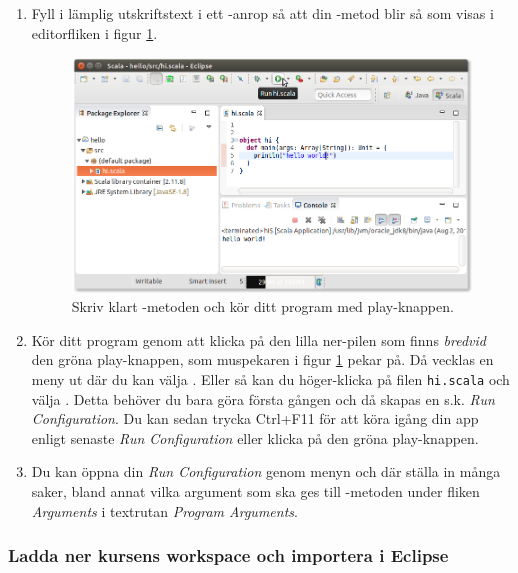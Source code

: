 \begin{enumerate}
\item Fyll i lämplig utskriftstext i ett -anrop så att din -metod blir så som visas i editorfliken i figur \ref{fig:appendix:eclipse:hello-world}.

\begin{figure}[H]
\centering
\includegraphics[width=1.0\textwidth]{../img/eclipse/eclipse-hello-world.png}
\caption{Skriv klart -metoden och kör ditt program med play-knappen.}
\label{fig:appendix:eclipse:hello-world}
\end{figure}

\item Kör ditt program genom att klicka på den lilla ner-pilen som finns \emph{bredvid} den gröna play-knappen, som muspekaren i figur \ref{fig:appendix:eclipse:hello-world} pekar på. Då vecklas en meny ut där du kan välja . Eller så kan du höger-klicka på filen \texttt{hi.scala} och välja . Detta behöver du bara göra första gången och då skapas en s.k. \textit{Run Configuration}. Du kan sedan trycka Ctrl+F11 för att köra igång din app enligt senaste \textit{Run Configuration} eller klicka på den gröna play-knappen.

\item Du kan öppna din \textit{Run Configuration} genom menyn   och där ställa in många saker, bland annat vilka argument som ska ges till -metoden under fliken \textit{Arguments} i textrutan \textit{Program Arguments}.

\end{enumerate}




\subsubsection{Ladda ner kursens workspace och importera i Eclipse}\label{subsubsection:download--import-workspace}


